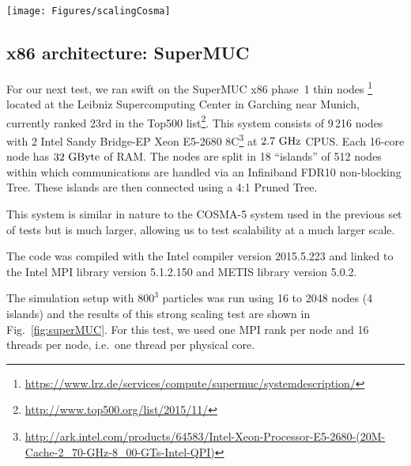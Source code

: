 \documentclass{sig-alternate-05-2015}
\newcommand{\swift}{{\sc swift}\xspace}
\begin{document}
\begin{figure*}
\centering
\texttt{[image: Figures/scalingCosma]}
\caption{Strong scaling test on the COSMA-5 machine (see text for hardware
  description). \textit{Left panel:} Code Speed-up. \textit{Right panel:}
  Corresponding parallel efficiency.  Using 16 threads per node (no use of
  hyper-threading) with one MPI rank per node, a good parallel efficiency (60\%)
  is achieved when increasing the thread count from 1 (1 node) to 128 (8 nodes)
  even on this relatively small test case. The dashed line indicates the
  efficiency when running on one single node but using all the physical and
  virtual cores (hyper-threading). As these CPUs only have one FPU per core, the
  benefit from hyper-threading is limited to a 20\% improvement when going
  from 16 cores to 32 hyperthreads.
  \label{fig:cosma}}
\end{figure*}



\subsection{x86 architecture: SuperMUC}

For our next test, we ran \swift on the SuperMUC x86 phase~1 thin
nodes \footnote{\url{https://www.lrz.de/services/compute/supermuc/systemdescription/}}
located at the Leibniz Supercomputing Center in Garching near Munich,
currently ranked 23rd in the Top500 list\footnote{\url{http://www.top500.org/list/2015/11/}}. This
system consists of 9\,216 nodes with 2 Intel Sandy Bridge-EP Xeon E5-2680
8C\footnote{\url{http://ark.intel.com/products/64583/Intel-Xeon-Processor-E5-2680-(20M-Cache-2_70-GHz-8_00-GTs-Intel-QPI)}}
at $2.7~\rm{GHz}$ CPUS. Each 16-core node has $32~\rm{GByte}$ of RAM.
The nodes are split in 18
``islands'' of 512 nodes within which communications are handled via an
Infiniband FDR10 non-blocking Tree. These islands are then connected using a 4:1
Pruned Tree.

This system is similar in nature to the COSMA-5 system used in the previous set
of tests but is much larger, allowing us to test scalability at a much larger
scale.

The code was compiled with the Intel compiler version \textsc{2015.5.223} and
linked to the Intel MPI library version \textsc{5.1.2.150} and METIS library
version \textsc{5.0.2}.

The simulation setup with $800^3$ particles was run using 16 to
2048 nodes (4 islands) and the results of this strong scaling test are shown in
Fig.~\ref{fig:superMUC}. For this test, we used one MPI rank per node and 16
threads per node, i.e.~one thread per physical core.
\end{document}
